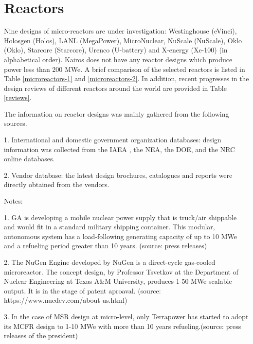\section{Reactors} \label{sec:reactors}
Nine designs of micro-reactors are under investigation: Westinghouse (eVinci), Holosgen (Holos), \gls{LANL} (MegaPower), MicroNuclear, NuScale (NuScale), Oklo (Oklo), Starcore (Starcore), Urenco (U-battery) and X-energy (Xe-100) (in alphabetical order). Kairos does not have any reactor designs which produce power less than 200 MWe. A brief comparison of the selected reactors is listed in Table \ref{microreactors-1} and \ref{microreactors-2}. In addition, recent progresses in the design reviews of different reactors around the world are provided in Table \ref{reviews}. 

The information on reactor designs was mainly gathered from the following sources.

1. International and domestic government organization databases: design information was collected from the \gls{IAEA} , the \gls{NEA}, the \gls{DOE}, and the NRC online databases.

2. Vendor database: the latest design brochures, catalogues and reports were directly obtained from the vendors.

Notes:

1. \gls{GA} is developing a mobile nuclear power supply that is truck/air shippable and would fit in a standard military shipping container. This modular, autonomous system has a load-following generating capacity of up to 10 MWe and a refueling period greater than 10 years. (source: press releases)

2. The NuGen Engine developed by NuGen is a direct-cycle gas-cooled microreactor. The concept design, by Professor Tsvetkov at the Department of Nuclear Engineering at Texas A$\&$M University, produces 1-50 MWe scalable output. It is in the stage of patent aproaval. (source: https://www.nucdev.com/about-us.html)

3. In the case of \gls{MSR} design at micro-level, only Terrapower has started to adopt its \gls{MCFR} design to 1-10 MWe with more than 10 years refueling.(source: press releases of the president) 

